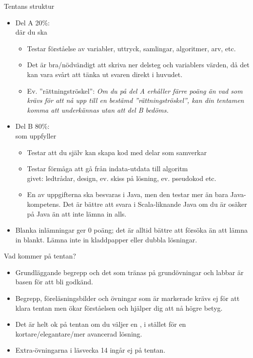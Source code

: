 \begin{Slide}{Tentans struktur}
\begin{itemize}\SlideFontSmall
\item Del A 20\%:\\ där du ska 
\begin{itemize}\SlideFontTiny
\item Testar förståelse av variabler, uttryck, samlingar, algoritmer, arv, etc.
\item Det är bra/nödvändigt att skriva ner delsteg och variablers värden, då det kan vara svårt att tänka ut svaren direkt i huvudet.
\item Ev. ''rättningströskel'': \textit{Om du på del A erhåller färre poäng än vad som krävs för att nå upp till en bestämd ''rättningströskel'', kan din tentamen komma att underkännas utan att del B bedöms.}
\end{itemize}


\item Del B 80\%:\\ som uppfyller 
\begin{itemize}\SlideFontTiny
\item Testar att du själv kan skapa kod med delar som samverkar
\item Testar förmåga att gå från indata-utdata till algoritm \\
 givet: ledtrådar, design, ev. skiss på lösning, ev. pseudokod etc.
\item En av uppgifterna ska besvaras i Java, men den testar mer än bara Java-kompetens. Det är bättre att svara i Scala-liknande Java om du är osäker på Java än att inte lämna in alls.
\end{itemize}
\item Blanka inlämningar ger 0 poäng; det är alltid bättre att försöka än att lämna in blankt. Lämna inte in kladdpapper eller dubbla lösningar.
\end{itemize}
\end{Slide}


\begin{Slide}{Vad kommer på tentan?}
\begin{itemize}
\item Grundläggande begrepp och det som tränas på grundövningar och labbar är basen för att bli godkänd.
\item Begrepp, föreläsningsbilder och övningar som är markerade  krävs ej för att klara tentan men ökar förståelsen och hjälper dig att nå högre betyg.
\item Det är helt ok på tentan om du väljer en  , i stället för en kortare/elegantare/mer avancerad lösning.
\item Extra-övningarna i läsvecka 14 ingår ej på tentan.
\end{itemize}
\end{Slide}



